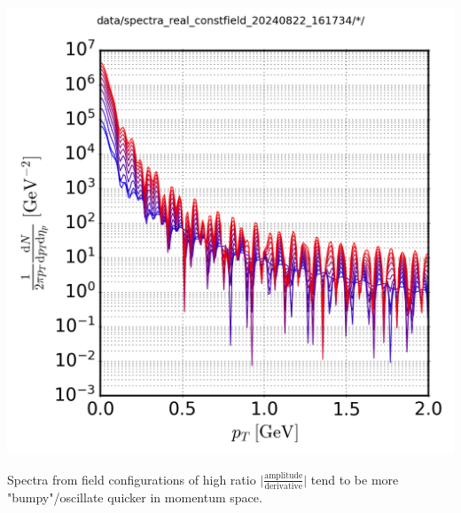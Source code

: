 {\begin{minipage}{\linewidth}
{\begin{minipage}{0.45\linewidth}
                \includegraphics[width=\linewidth]{code/C++/DCCspec/data/images/spectra_real_constfield_20240822_161734_spec.png}        
            \end{minipage}
        }
    \end{minipage}
}
Spectra from field configurations of high ratio ${\Big\vert\frac{\text{amplitude}}{\text{derivative}}\Big\vert}$ tend to be more "bumpy"/oscillate quicker in momentum space.

